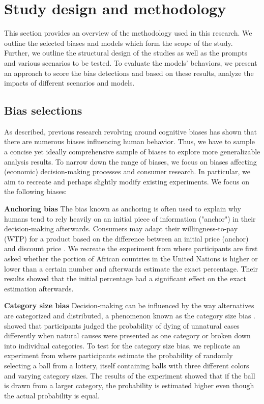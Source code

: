 \section{Study design and methodology}
\label{chapter:methodology}

\par This section provides an overview of the methodology used in this research. We outline the selected biases and models which form the scope of the study. Further, we outline the structural design of the studies as well as the prompts and various scenarios to be tested. To evaluate the models' behaviors, we present an approach to score the bias detections and based on these results, analyze the impacts of different scenarios and models.


\subsection{Bias selections}
\par As described, previous research revolving around cognitive biases has shown that there are numerous biases influencing human behavior. Thus, we have to sample a concise yet ideally comprehensive sample of biases to explore more generalizable analysis results. To narrow down the range of biases, we focus on biases affecting (economic) decision-making processes and consumer research. In particular, we aim to recreate and perhaps slightly modify existing experiments. We focus on the following biases:

\setlength{\parindent}{20pt}
\par \textbf{Anchoring bias} The bias known as anchoring is often used to explain why humans tend to rely heavily on an initial piece of information ("anchor") in their decision-making afterwards. Consumers may adapt their willingness-to-pay (WTP) for a product based on the difference between an initial price (anchor) and discount price \parencite{chandrashekaran2006anchoring}. We recreate the experiment from \textcite{tversky1974judgment} where participants are first asked whether the portion of African countries in the United Nations is higher or lower than a certain number and afterwards estimate the exact percentage. Their results showed that the initial percentage had a significant effect on the exact estimation afterwards.

\par \textbf{Category size bias} Decision-making can be influenced by the way alternatives are categorized and distributed, a phenomenon known as the category size bias \parencite{isaac2014judging}. \textcite{tversky1994support} showed that participants judged the probability of dying of unnatural cases differently when natural causes were presented as one category or broken down into individual categories. To test for the category size bias, we replicate an experiment from \textcite{isaac2014judging} where participants estimate the probability of randomly selecting a ball from a lottery, itself containing balls with three different colors and varying category sizes. The results of the experiment showed that if the ball is drawn from a larger category, the probability is estimated higher even though the actual probability is equal.

